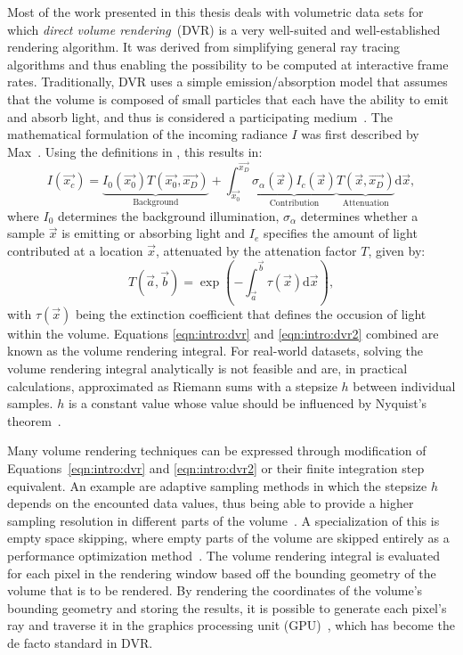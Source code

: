 Most of the work presented in this thesis deals with  volumetric data sets for which \emph{direct volume rendering}~(DVR) is a very well-suited and well-established rendering algorithm. It was derived from simplifying general ray tracing algorithms and thus enabling the possibility to be computed at interactive frame rates.  Traditionally, DVR uses a simple emission/absorption model that assumes that the volume is composed of small particles that each have the ability to emit and absorb light, and thus is considered a participating medium~\cite{levoy1988display, drebin1988volume, sabella1988rendering}.  The mathematical formulation of the incoming radiance $I$ was first described by Max~\cite{max1995optical, max2010local}.  Using the definitions in , this results in:
\begin{equation}
I(\vec{x_c}) = \underbrace{I_0 \left( \vec{x_0} \right) T\left( \vec{x_0}, \vec{x_D} \right)}_{\textrm{Background}} + \int_\vec{x_0}^\vec{x_D} \underbrace{\sigma_\alpha(\vec{x}) I_c(\vec{x})}_{\textrm{Contribution}}  \underbrace{T(\vec{x}, \vec{x_D})}_{\textrm{Attenuation}} \textrm{d} \vec{x},
\label{eqn:intro:dvr}
\end{equation}
\noindent where $I_0$ determines the background illumination, $\sigma_\alpha$ determines whether a sample $\vec{x}$ is emitting or absorbing light and $I_e$ specifies the amount of light contributed at a location $\vec{x}$, attenuated by the attenation factor $T$, given by:
\begin{equation}
T(\vec{a}, \vec{b}) = \exp \left( -\int_\vec{a}^\vec{b} \tau(\vec{x}) \textrm{d} \vec{x} \right),
\label{eqn:intro:dvr2}
\end{equation}
\noindent with $\tau(\vec{x})$ being the extinction coefficient that defines the occusion of light within the volume.  Equations \ref{eqn:intro:dvr} and \ref{eqn:intro:dvr2} combined are known as the volume rendering integral.  For real-world datasets, solving the volume rendering integral analytically is not feasible and are, in practical calculations, approximated as Riemann sums with a stepsize $h$ between individual samples.  $h$ is a constant value whose value should be influenced by Nyquist's theorem~\cite{shannon1949communication}.

Many volume rendering techniques can be expressed through modification of Equations~\ref{eqn:intro:dvr} and \ref{eqn:intro:dvr2} or their finite integration step equivalent.  An example are adaptive sampling methods in which the stepsize $h$ depends on the encounted data values, thus being able to provide a higher sampling resolution in different parts of the volume~\cite{danskin1992fast}.  A specialization of this is empty space skipping, where empty parts of the volume are skipped entirely as a performance optimization method~\cite{yagel1993accelerating}.  The volume rendering integral is evaluated for each pixel in the rendering window based off the bounding geometry of the volume that is to be rendered.  By rendering the coordinates of the volume's bounding geometry and storing the results, it is possible to generate each pixel's ray and traverse it in the graphics processing unit (GPU)~\cite{kruger2003acceleration}, which has become the de facto standard in DVR.



